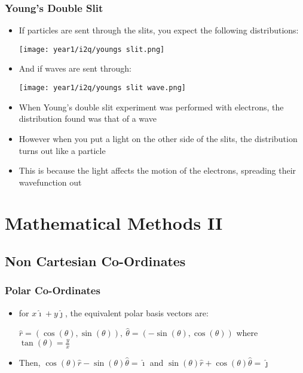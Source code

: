\documentclass{article}
\begin{document}
\subsubsection*{Young's Double Slit}
\begin{itemize}
    \item If particles are sent through the slits, you expect the following distributions:

    \texttt{[image: year1/i2q/youngs slit.png]}
    \item And if waves are sent through:
    
    \texttt{[image: year1/i2q/youngs slit wave.png]}
    \item When Young's double slit experiment was performed with electrons, the distribution found was that of a wave
    \item However when you put a light on the other side of the slits, the distribution turns out like a particle
    \item This is because the light affects the motion of the electrons, spreading their wavefunction out

\end{itemize}

\newpage
\section{Mathematical Methods II}
\subsection{Non Cartesian Co-Ordinates}

\subsubsection*{Polar Co-Ordinates}
\begin{itemize}
    \item for \(x\hat{\imath} + y\hat{\jmath}\), the equivalent polar basis vectors are:
    
    \(\hat{r} = (\cos(\theta), \sin(\theta)), \:\hat{\theta} = (-\sin(\theta), \cos(\theta))\)
    where \(\tan(\theta) = \frac{y}{x}\)
    \item Then, \(\cos(\theta)\hat{r} - \sin(\theta) \hat{\theta} = \hat{\imath}\)
    and \(\sin(\theta)\hat{r} + \cos(\theta)\hat{\theta} = \hat{\jmath}\)
\end{itemize}
\end{document}
